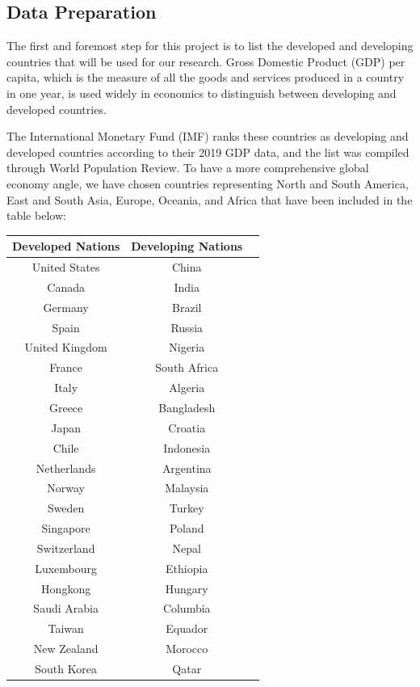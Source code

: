 \documentclass[12pt,oneside]{book} %
\begin{document}
\subsection{Data Preparation}
\hspace{20pt}The first and foremost step for this project is to list the developed and developing countries that will be used for our research. Gross Domestic Product (GDP) per capita, which is the measure of all the goods and services produced in a country in one year, is used widely in economics to distinguish between developing and developed countries.

The International Monetary Fund (IMF) ranks these countries as developing and developed countries according to their 2019 GDP data, and the list was compiled through World Population Review. To have a more comprehensive global economy angle, we have chosen countries representing North and South America, East and South Asia, Europe, Oceania, and Africa that have been included in the table below:

 \begin{center}
     

 \begin{tabular}{||c | c | c ||} 
    \hline
 \textbf{Developed Nations } & \textbf{Developing Nations} \\ [0.5ex] 
 \hline\hline
 United States & China \\ 
 \hline
 Canada & India  \\
 \hline
 Germany  & Brazil \\
 \hline
 Spain & Russia \\
 \hline
 United Kingdom & Nigeria  \\
  \hline
  France& South Africa \\
 \hline
 Italy & Algeria \\
 \hline
 Greece & Bangladesh \\
 \hline
 Japan & Croatia  \\
  \hline
 Chile & Indonesia  \\
 \hline
 Netherlands& Argentina \\
 \hline
 Norway & Malaysia  \\
 \hline
 Sweden & Turkey \\
 \hline
 Singapore& Poland  \\
 \hline
 Switzerland & Nepal \\
 \hline
 Luxembourg & Ethiopia  \\
 \hline
 Hongkong & Hungary  \\
  \hline
 Saudi Arabia & Columbia \\
  \hline
  Taiwan & Equador  \\
 \hline
  New Zealand & Morocco  \\
 \hline
  South Korea& Qatar \\ [1ex] 
 \hline
\end{tabular}
 \end{center} 
\end{document}
